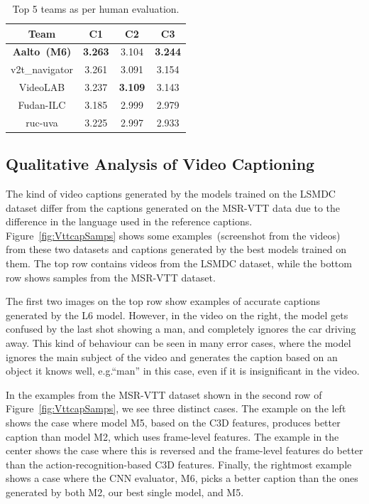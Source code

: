 \begin{table}[tbh]
  \centering
  \newcommand{\bs}{\small\bf}
  \begin{tabular}{||c|c|c|c|}
    \hline\hline
    \bf Team  &\bs C1 &\bs C2 &\bs C3 \\\hline\hline
    \bf Aalto~(M6)     & \bf3.263 & 3.104 & \bf3.244\\
    v2t\_navigator & 3.261 & 3.091 & 3.154 \\
    VideoLAB       & 3.237 & \bf3.109 & 3.143 \\
    Fudan-ILC      & 3.185 & 2.999 & 2.979 \\
    ruc-uva        & 3.225 & 2.997 & 2.933 \\\hline
    \hline
  \end{tabular}
  \caption{Top 5 teams as per human evaluation.}
  \label{tab:resultsTestHum}
\end{table}


\subsection{Qualitative Analysis of Video Captioning}
The kind of video captions generated by the models trained on the LSMDC dataset
differ from the captions generated on the MSR-VTT data due to the difference
in the language used in the reference captions.
Figure~\ref{fig:VttcapSamps} shows some examples~(screenshot from the
videos) from these two datasets and captions generated by the best models
trained on them.
The top row contains videos from the LSMDC dataset, while the bottom row shows
samples from the MSR-VTT dataset. 

The first two images on the top row show examples of accurate captions
generated by the L6 model.
However, in the video on the right, the model gets confused by the last shot
showing a man, and completely ignores the car driving away.
This kind of behaviour can be seen in many error cases, where the model
ignores the main subject of the video and generates the caption based on an
object it knows well, e.g.\@ ``man'' in this case, even if it is insignificant
in the video.

In the examples from the MSR-VTT dataset shown in the second row of
Figure~\ref{fig:VttcapSamps}, we see three distinct cases.
The example on the left shows the case where model M5, based on the C3D
features, produces better caption than model M2, which uses frame-level
features.
The example in the center shows the case where this is reversed and the
frame-level features do better than the action-recognition-based C3D features.
Finally, the rightmost example shows a case where the CNN evaluator, M6, picks
a better caption than the ones generated by both M2, our best single model, and
M5.

